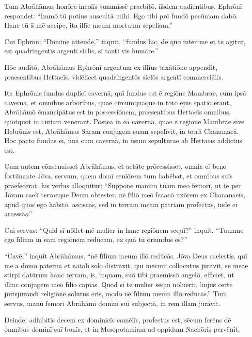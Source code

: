 \Versus Tum Abrāhāmus honōre incolīs summissē praebitō, iīsdem audientibus, Ephrōnī respondet:
\Versus ``Immō tū potius auscultā mihi. Ego tibi prō fundō pecūniam dabō. Hanc tū ā mē accipe, ita illīc meum mortuum sepeliam.''

\Versus Cui Ephrōn:
\Versus ``Domine attende,'' inquit, ``fundus hic, dē quō inter mē et tē agitur, est quadringentīs argentī siclīs, sī tantī vīs humāre.''

\Versus Hōc audītō, Abrāhāmus Ephrōnī argentum ex illīus taxātiōne appendit, praesentibus Hettaeīs, vidēlicet quadringentōs siclōs argentī commerciālis.

\Versus Ita Ephrōnis fundus duplicī cavernā, quī fundus est ē regiōne Mambrae, cum ipsā cavernā, et omnibus arboribus, quae circumquāque in tōtō ejus spatiō erant,
\Versus Abrāhāmō ēmancipātus est in possessiōnem, praesentibus Hettaeīs omnibus, quotquot in cūriam vēnerant.
\Versus Posteā in eā cavernā, quae ē regiōne Mambrae sīve Hebrōnis est,
\Versus Abrāhāmus Saram conjugem suam sepelīvit, in terrā Chananaeā.
\Versus Hōc pactō fundus eī, ūnā cum cavernā, in ūsum sepultūrae ab Hettaeīs addictus est.



\Caput
\Versus Cum autem cōnsenuisset Abrāhāmus, et aetāte prōcessisset, omnia eī bene fortūnante Jōva,
\Versus servum, quem domī seniōrem tum habēbat, et omnibus suīs praefēcerat, hīs verbīs alloquitur: ``Suppōne manum tuam meō femorī,
\Versus ut tē per Jōvam caelī terraeque Deum obtester, nē fīliō meō Isaacō uxōrem ex Chananaeīs, apud quōs ego habitō, ascīscās,
\Versus sed in terram meam patriam profectus, inde eī arcessās.''

\Versus Cui servus: ``Quid sī nōllet mē mulier in hanc regiōnem sequī?'' inquit. ``Tuumne ego fīlium in eam regiōnem redūcam, ex quā tū oriundus es?''

\Versus ``Cavē,'' inquit Abrāhāmus, ``nē fīlium meum illō redūcās.
\Versus Jōva Deus caelestis, quī mē ā domō paternā et nātālī solō distrāxit, quī mēcum collocūtus jūrāvit, sē meae stirpī datūrum hanc terram, is, inquam, suō tibi praemissō angelō, efficiet, ut illinc conjugem meō fīliō capiās.
\Versus Quod sī tē mulier sequī nōluerit, hujus certē jūrisjūrandī religiōnē solūtus eris, modo nē fīlium meum illō redūcās.''
\Versus Tum servus, manū femorī Abrāhāmī dominī suī subjectā, in rem illam jūrāvit.

\Versus Deinde, adhibitīs decem ex dominicīs camēlīs, profectus est, sēcum ferēns dē omnibus dominī suī bonīs, et in Mesopotamiam ad oppidum Nachōris pervēnit.

